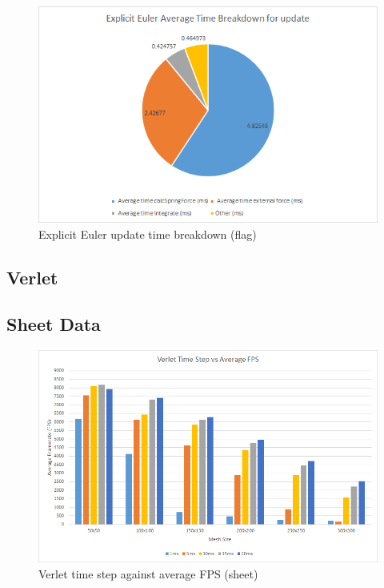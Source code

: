     \begin{figure}
    \begin{center}
      \includegraphics[scale=.9]{Figures/flag_ee_ut}
    \end{center}
    \caption{Explicit Euler update time breakdown (flag)}
    \label{fig:ee ut flag}
  \end{figure}

\begin{landscape}
\section{Verlet}

\subsection{Sheet Data}

  \begin{figure}[!htb]
    \begin{center}
      \includegraphics{Figures/sheet_v_fps}
    \end{center}
    \caption{Verlet time step against average FPS (sheet)}
    \label{fig:v fps sheet}
  \end{figure}
\end{landscape}
  
